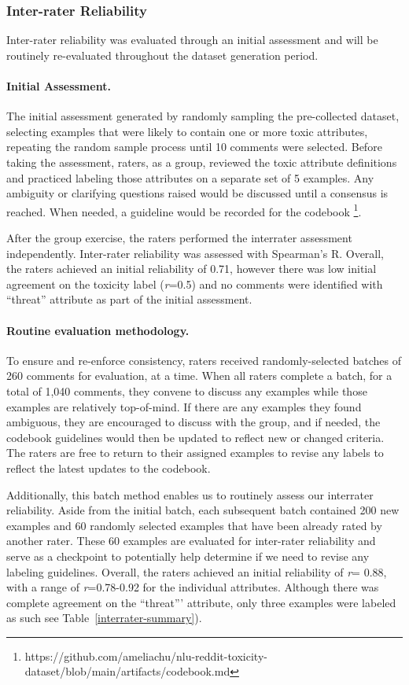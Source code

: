 \documentclass[11pt]{article}
\begin{document}
\subsubsection{Inter-rater Reliability}
Inter-rater reliability was evaluated through an initial assessment and will be routinely re-evaluated throughout the dataset generation period. 

\paragraph{Initial Assessment.}
The initial assessment generated by randomly sampling the pre-collected dataset, selecting examples that were likely to contain one or more toxic attributes, repeating the random sample process until 10 comments were selected. Before taking the assessment, raters, as a group, reviewed the toxic attribute definitions and practiced labeling those attributes on a separate set of 5 examples. Any ambiguity or clarifying questions raised would be discussed until a consensus is reached. When needed, a guideline would be recorded for the codebook \footnote{https://github.com/ameliachu/nlu-reddit-toxicity-dataset/blob/main/artifacts/codebook.md}.

After the group exercise, the raters performed the interrater assessment independently. Inter-rater reliability was assessed with Spearman's R. Overall, the raters achieved an initial reliability of 0.71, however there was low initial agreement on the toxicity label (\emph{r}=0.5) and no comments were identified with ``threat'' attribute as part of the initial assessment.


\paragraph{Routine evaluation methodology.}

To ensure and re-enforce consistency, raters received randomly-selected batches of 260 comments for evaluation, at a time. When all raters complete a batch, for a total of 1,040 comments, they convene to discuss any examples while those examples are relatively top-of-mind. If there are any examples they found ambiguous, they are encouraged to discuss with the group, and if needed, the codebook guidelines would then be updated to reflect new or changed criteria. The raters are free to return to their assigned examples to revise any labels to reflect the latest updates to the codebook. 

Additionally, this batch method enables us to routinely assess our interrater reliability. Aside from the initial batch, each subsequent batch contained 200 new examples and 60 randomly selected examples that have been already rated by another rater. These 60 examples are evaluated for inter-rater reliability and serve as a checkpoint to potentially help determine if we need to revise any labeling guidelines. Overall, the raters achieved an initial reliability of \emph{r}= 0.88, with a range of \emph{r}=0.78-0.92 for the individual attributes. Although there was complete agreement on the ``threat''' attribute, only three examples were labeled as such see Table~\ref{interrater-summary}).
\end{document}
